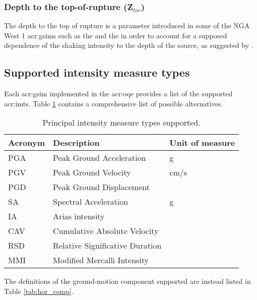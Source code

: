 \subsubsection{Depth to the top-of-rupture (Z$_{tor}$)}
The depth to the top of rupture is a parameter introduced in some of the NGA
West 1 \glspl{acr:gsim} such as the \textcite{chiou2008} and the
\textcite{abrahamson2008} in order to account for a supposed dependence
of the shaking intensity to the depth of the source, as suggested by
\textcite{somerville2006a}.
%
\subsection{Supported intensity measure types}
Each \gls{acr:gsim} implemented in the \gls{acr:oqe} provides a list of the 
supported \glspl{acr:imt}. Table \ref{tab:imts} contains a comprehensive list 
of possible alternatives.
\begin{table}[!h]
\centering
\caption{Principal intensity measure types supported.}
\begin{tabular}{|p{3cm}p{5cm}p{3cm}|}
\hline
\rowcolor{anti-flashwhite}
\bf{Acronym} & \bf{Description} & \bf{Unit of measure} \\
\hline 
PGA & Peak Ground Acceleration & g \\
PGV & Peak Ground Velocity     & cm/s \\
PGD & Peak Ground Displacement & \\
SA  & Spectral Acceleration    & g \\
IA  & Arias intensity &  \\
CAV & Cumulative Absolute Velocity &  \\
RSD & Relative Significative Duration \parencite{trifunac1975}&  \\
MMI & Modified Mercalli Intensity &  \\
\hline
\end{tabular}
\label{tab:imts}
\end{table}
The definitions of the ground-motion component supported are instead listed in
Table \ref{tab:hor_comp}. 

